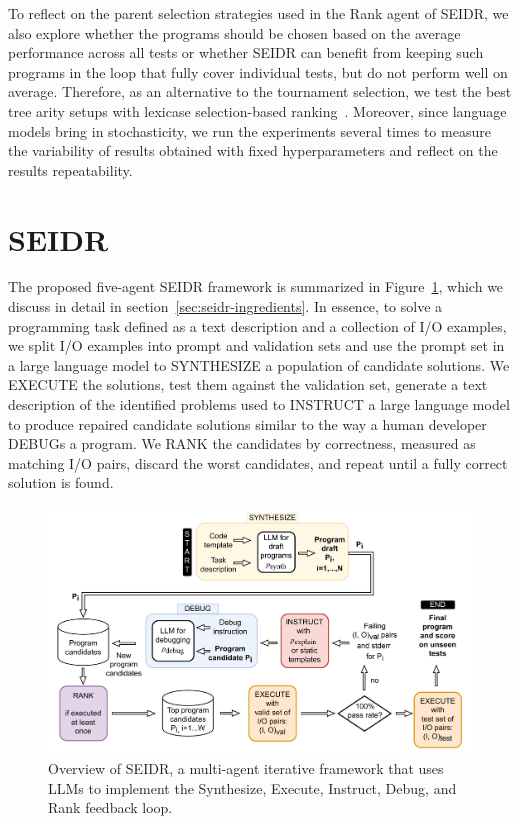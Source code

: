 To reflect on the parent selection strategies used in the Rank agent of SEIDR, we also explore whether the programs should be chosen based on the average performance across all tests or whether SEIDR can benefit from keeping such programs in the loop that fully cover individual tests, but do not perform well on average.
Therefore, as an alternative to the tournament selection, we test the best tree arity setups with lexicase selection-based ranking~\cite{helmuth2015:solving}.
Moreover, since language models bring in stochasticity, we run the experiments several times to measure the variability of results obtained with fixed hyperparameters and reflect on the results repeatability.

\newpage\section{SEIDR}
\label{sec:seidr-methodology}
The proposed five-agent SEIDR framework is summarized in Figure~\ref{fig:method}, which we discuss in detail in section~\ref{sec:seidr-ingredients}.
In essence, to solve a programming task defined as a text description and a collection of I/O examples, we split I/O examples into prompt and validation sets and use the prompt set in a large language model to SYNTHESIZE a population of candidate solutions.
We EXECUTE the solutions, test them against the validation set, generate a text description of the identified problems used to INSTRUCT a large language model to produce repaired candidate solutions similar to the way a human developer DEBUGs a program.
We RANK the candidates
by correctness, measured as matching I/O pairs, discard the worst candidates, and repeat until a fully correct solution is found.

\begin{figure}
    \centering
    \includegraphics[width=\linewidth,trim={0mm 0mm 0mm 0mm}]{images/codex-for-psb-seidr-methodology-5.drawio.pdf}
    \caption{Overview of SEIDR, a multi-agent iterative framework that uses LLMs to implement the Synthesize, Execute, Instruct, Debug, and Rank feedback loop.}
    \label{fig:method}
\end{figure}
 

